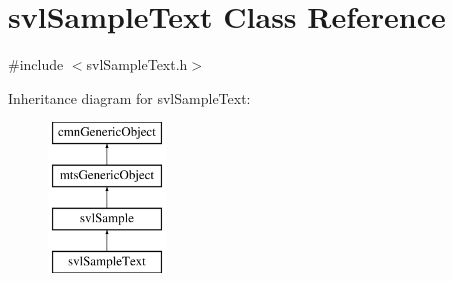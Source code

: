 \hypertarget{classsvl_sample_text}{}\section{svl\+Sample\+Text Class Reference}
\label{classsvl_sample_text}


{\ttfamily \#include $<$svl\+Sample\+Text.\+h$>$}

Inheritance diagram for svl\+Sample\+Text\+:\begin{figure}[H]
\begin{center}
\leavevmode
\includegraphics[height=4.000000cm]{d7/df9/classsvl_sample_text}
\end{center}
\end{figure}
